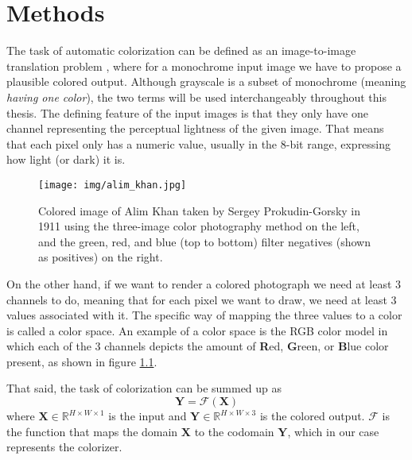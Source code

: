 \begin{comment}
    Use cases
    Multimodality

    Neural networks:
        Basics
        CNN
        U-NET

    Dataset

    Implementations:
        Colorful image colorization
        GAN/pix2pix
        IDeep
\end{comment}

\chapter{Methods}

The task of automatic colorization can be defined as an image-to-image 
translation problem \citep{pang2021imagetoimage}, where for a monochrome 
input image we have to propose a plausible colored output. Although 
grayscale is a subset of monochrome (meaning \textit{having one color}), 
the two terms will be used interchangeably throughout this thesis. 
The defining feature of the input images is that they only have one channel 
representing the perceptual lightness of the given image. That means that 
each pixel only has a numeric value, usually in the 8-bit range, 
expressing how light (or dark) it is. 

\begin{figure}[H]
    \centering
    \texttt{[image: img/alim\_khan.jpg]}
    \caption{
    Colored image of Alim Khan taken by Sergey Prokudin-Gorsky 
    in 1911 using the three-image color photography method on the left,
    and the green, red, and blue (top to bottom) filter negatives
    (shown as positives) on the right.}
    \label{fig:alim_khan}
\end{figure}

On the other hand, if we want to render a colored photograph we need at 
least 3 channels to do, meaning that for each pixel we want to draw, 
we need at least 3 values associated with it. The specific way of mapping 
the three values to a color is called a color space. An example of a color
space is the RGB color model in which each of the 3 channels depicts the 
amount of \textbf{R}ed, \textbf{G}reen, or \textbf{B}lue color present,
as shown in figure \ref{fig:alim_khan}. 

That said, the task of colorization can be summed up as
    \[\mathbf{Y} = \mathcal{F}(\mathbf{X})\]
where $\mathbf{X} \in \mathbb{R}^{H \times W \times 1}$ is the input 
and $\mathbf{Y} \in \mathbb{R}^{H \times W \times 3}$ is the colored output.
$\mathcal{F}$ is the function that maps the domain $\mathbf{X}$ to the codomain 
$\mathbf{Y}$, which in our case represents the colorizer.


